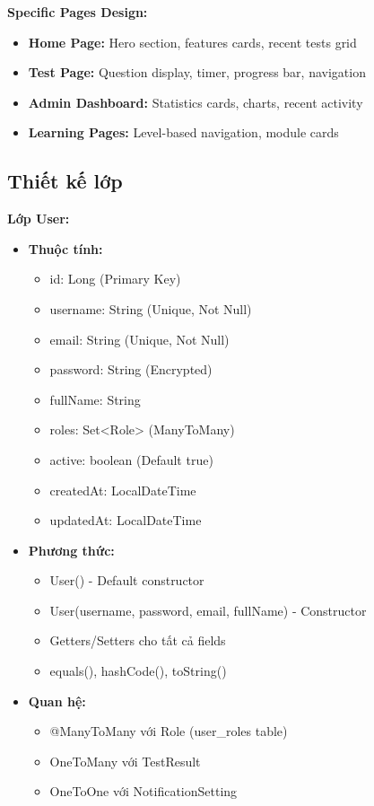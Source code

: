 \documentclass[../DoAn.tex]{subfiles}
\begin{document}
\textbf{Specific Pages Design:}
\begin{itemize}
    \item \textbf{Home Page:} Hero section, features cards, recent tests grid
    \item \textbf{Test Page:} Question display, timer, progress bar, navigation
    \item \textbf{Admin Dashboard:} Statistics cards, charts, recent activity
    \item \textbf{Learning Pages:} Level-based navigation, module cards
\end{itemize}

\subsection{Thiết kế lớp}

\textbf{Lớp User:}
\begin{itemize}
    \item \textbf{Thuộc tính:} 
    \begin{itemize}
        \item id: Long (Primary Key)
        \item username: String (Unique, Not Null)
        \item email: String (Unique, Not Null) 
        \item password: String (Encrypted)
        \item fullName: String
        \item roles: Set<Role> (ManyToMany)
        \item active: boolean (Default true)
        \item createdAt: LocalDateTime
        \item updatedAt: LocalDateTime
    \end{itemize}
    \item \textbf{Phương thức:} 
    \begin{itemize}
        \item User() - Default constructor
        \item User(username, password, email, fullName) - Constructor
        \item Getters/Setters cho tất cả fields
        \item equals(), hashCode(), toString()
    \end{itemize}
    \item \textbf{Quan hệ:} 
    \begin{itemize}
        \item @ManyToMany với Role (user\_roles table)
        \item OneToMany với TestResult
        \item OneToOne với NotificationSetting
    \end{itemize}
\end{itemize}
\end{document}
